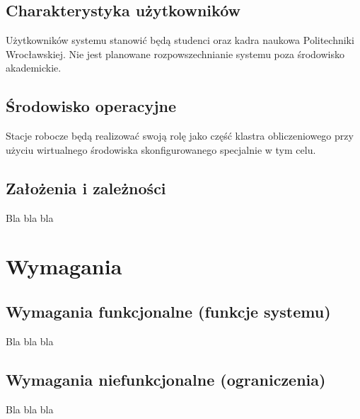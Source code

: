 \documentclass[a4paper,10pt]{article}
\begin{document}
\subsection{Charakterystyka użytkowników}
Użytkowników systemu stanowić będą studenci oraz kadra naukowa Politechniki Wrocławskiej. Nie jest planowane rozpowszechnianie systemu poza środowisko akademickie.
\subsection{Środowisko operacyjne}
Stacje robocze będą realizować swoją rolę jako część klastra obliczeniowego przy użyciu wirtualnego środowiska skonfigurowanego specjalnie w tym celu.
\subsection{Założenia i zależności}
Bla bla bla
\section{Wymagania}
\subsection{Wymagania funkcjonalne (funkcje systemu)}
Bla bla bla
\subsection{Wymagania niefunkcjonalne (ograniczenia)}
Bla bla bla
\end{document}
